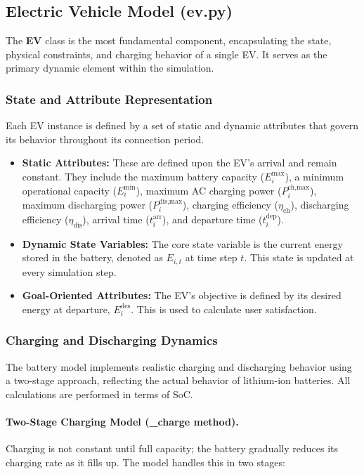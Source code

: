 \subsection{Electric Vehicle Model (\textbf{ev.py})}
The \textbf{EV} class is the most fundamental component, encapsulating the state, physical constraints, and charging behavior of a single EV. It serves as the primary dynamic element within the simulation.

\subsubsection{State and Attribute Representation}
Each EV instance is defined by a set of static and dynamic attributes that govern its behavior throughout its connection period.
\noindent
\begin{itemize}
    \item \textbf{Static Attributes:} These are defined upon the EV's arrival and remain constant. They include the maximum battery capacity ($E^{\text{max}}_i$), a minimum operational capacity ($E^{\text{min}}_i$), maximum AC charging power ($P^{\text{ch,max}}_i$), maximum discharging power ($P^{\text{dis,max}}_i$), charging efficiency ($\eta_{\text{ch}}$), discharging efficiency ($\eta_{\text{dis}}$), arrival time ($t^{\text{arr}}_i$), and departure time ($t^{\text{dep}}_i$).
    \item \textbf{Dynamic State Variables:} The core state variable is the current energy stored in the battery, denoted as $E_{i,t}$ at time step $t$. This state is updated at every simulation step.
    \item \textbf{Goal-Oriented Attributes:} The EV's objective is defined by its desired energy at departure, $E^{\text{des}}_i$. This is used to calculate user satisfaction.
\end{itemize}
\subsubsection{Charging and Discharging Dynamics}
The battery model implements realistic charging and discharging behavior using a two-stage approach, reflecting the actual behavior of lithium-ion batteries. All calculations are performed in terms of SoC.

\paragraph{Two-Stage Charging Model (\textbf{\_charge} method).}
Charging is not constant until full capacity; the battery gradually reduces its charging rate as it fills up. The model handles this in two stages:

